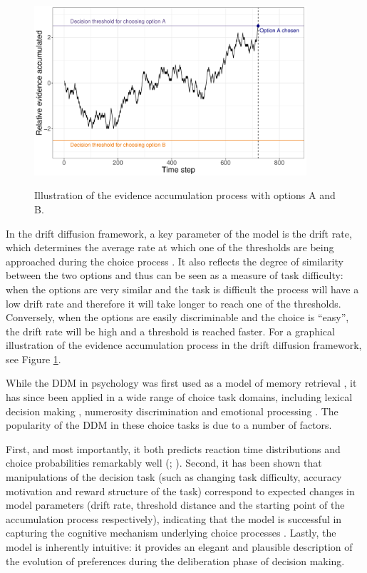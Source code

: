 \documentclass[11pt,a4paper]{article}
\begin{document}
\begin{figure}[h]
\centering
\caption{Illustration of the evidence accumulation process with options A and
B.}
\includegraphics[width=0.9\textwidth]{c1_randomwalk.pdf}
\label{fig:randomwalk}
\end{figure}


In the drift diffusion framework, a key parameter of the model is the drift rate, which determines the average rate at which one of the thresholds are being approached during the choice process \cite{Voss2004a}. It also reflects the degree of similarity between the two options and thus can be seen as a measure of task difficulty: when the options are very similar and the task is difficult the process will have a low drift rate and therefore it will take longer to reach one of the thresholds. Conversely, when the options are easily discriminable and the choice is “easy”, the drift rate will be high and a threshold is reached faster. For a graphical illustration of the evidence accumulation process in the drift diffusion framework, see Figure \ref{fig:randomwalk}.

While the DDM in psychology was first used as a model of memory retrieval \cite{Ratcliff1978b}, it has since been applied in a wide range of choice task domains, including lexical decision making \cite{Ratcliff2004}, numerosity discrimination \cite{Leite2011} and emotional processing \cite{Mueller2016}. The popularity of the DDM in these choice tasks is due to a number of factors. 

First, and most importantly, it both predicts reaction time distributions and choice probabilities remarkably well (; ). Second, it has been shown that manipulations of the decision task (such as changing task difficulty, accuracy motivation and reward structure of the task) correspond to expected changes in model parameters (drift rate, threshold distance and the starting point of the accumulation process respectively), indicating that the model is successful in capturing the cognitive mechanism underlying choice processes \cite{Voss2004a}. Lastly, the model is inherently intuitive: it provides an elegant and plausible description of the evolution of preferences during the deliberation phase of decision making.
\end{document}
